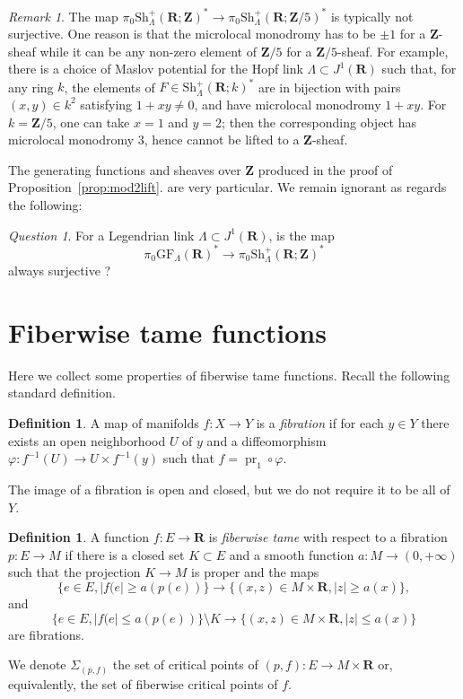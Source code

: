\documentclass[12pt,a4paper]{article}
\numberwithin{equation}{section}
\theoremstyle{definition}
\newtheorem{dfn}[equation]{Definition}
\theoremstyle{remark}
\newtheorem{remark}[equation]{Remark}
\newtheorem{question}[equation]{Question}
\newcommand{\Z}{\mathbf{Z}}
\newcommand{\R}{\mathbf{R}}
\newcommand{\Sh}{\mathrm{Sh}}
\DeclareMathOperator{\pr}{pr}
\newcommand{\GF}{\mathrm{GF}}
\begin{document}
\begin{remark}
The map
$\pi_0\Sh^+_\Lambda(\R;\Z)^* \to \pi_0 \Sh^+_\Lambda(\R;\Z/5)^*$
is typically not surjective. One reason is that the microlocal monodromy has to be $\pm 1$
for a $\Z$-sheaf while it can be any non-zero element of $\Z/5$ for a $\Z/5$-sheaf.
For example, there is a choice of Maslov potential for the Hopf link $\Lambda \subset J^1(\R)$ such that, for any ring $k$, the elements of $F\in \Sh^+_\Lambda(\R;k)^*$ are in bijection with pairs $(x,y)\in k^2$ satisfying $1+xy \neq 0$, and have microlocal monodromy $1+xy$.  For $k = \Z/5$, one can take $x=1$ and $y=2$; then the corresponding object has microlocal monodromy $3$, hence  cannot be lifted to a $\Z$-sheaf.
\end{remark}



The generating functions and sheaves over $\Z$ produced in the proof of Proposition~\ref{prop:mod2lift}.
are very particular.  We remain ignorant as regards the following:

\begin{question}
For a Legendrian link $\Lambda \subset J^1(\R)$, is the map
\[\pi_0\GF_\Lambda(\R)^*\to \pi_0\Sh^+_\Lambda(\R;\Z)^*\]
always surjective ?
\end{question}



\appendix

\section{Fiberwise tame functions} \label{app:fibinfty}

Here we collect some properties of fiberwise tame functions.
Recall the following standard definition.
\begin{dfn}
A map of manifolds $f:X\to Y$ is a \emph{fibration} if for each $y\in Y$ there exists an open neighborhood $U$ of $y$
and a diffeomorphism $\varphi:f^{-1}(U) \to U\times f^{-1}(y)$ such that $f=\pr_1\circ\varphi$.
\end{dfn}

The image of a fibration is open and closed, but we do not require it to be all of $Y$. 

\begin{dfn}
A function $f: E \to \R$ is {\em fiberwise tame} with respect to a fibration $p:E\to M$ if there is a closed set $K\subset E$ and a smooth function $a:M\to (0,+\infty)$
such that the projection $K\to M$ is proper and the maps
\[\{e\in E, |f(e|\geq a(p(e))\} \to \{(x,z)\in M\times \R, |z|\geq a(x)\},\]
and
\[\{e\in E, |f(e|\leq a(p(e))\} \setminus K \to \{(x,z)\in M\times \R, |z|\leq a(x)\}\]
are fibrations.

We denote $\Sigma_{(p,f)}$ the set of critical points of $(p,f):E\to M\times \R$ or, equivalently, the set of fiberwise critical points of $f$.
\end{dfn}
\end{document}

